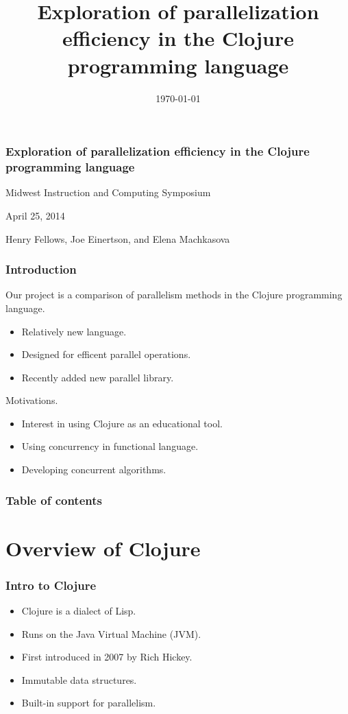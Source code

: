 \documentclass{beamer}
\begin{document}
\title{Exploration of parallelization efficiency in the Clojure programming language}
\date{\today}

\begin{frame}
\frametitle{Exploration of parallelization efficiency in the Clojure programming language}
{\centering
Midwest Instruction and Computing Symposium\par
April 25, 2014\par
Henry Fellows, Joe Einertson, and Elena Machkasova\par
}
\end{frame}

\begin{frame}[fragile]
\frametitle{Introduction}
	Our project is a comparison of parallelism methods in the Clojure programming language.
	\begin{itemize}
	\item Relatively new language.
	\item Designed for efficent parallel operations.
	\item Recently added new parallel library.
	\end{itemize}
	Motivations.
	\begin{itemize}
	\item Interest in using Clojure as an educational tool.
	\item Using concurrency in functional language.
	\item Developing concurrent algorithms.
	\end{itemize}
	
\end{frame}

\begin{frame}
\frametitle{Table of contents}
\tableofcontents %
\end{frame}
\section{Overview of Clojure}

\begin{frame}[fragile]
\frametitle{Intro to Clojure}
	\begin{itemize}
  	 \item Clojure is a dialect of Lisp.
	 \item Runs on the Java Virtual Machine (JVM).
  	 \item First introduced in 2007 by Rich Hickey.
  	 \item Immutable data structures.
	 \item Built-in support for parallelism.
	 \end{itemize}
\end{frame}
\end{document}
